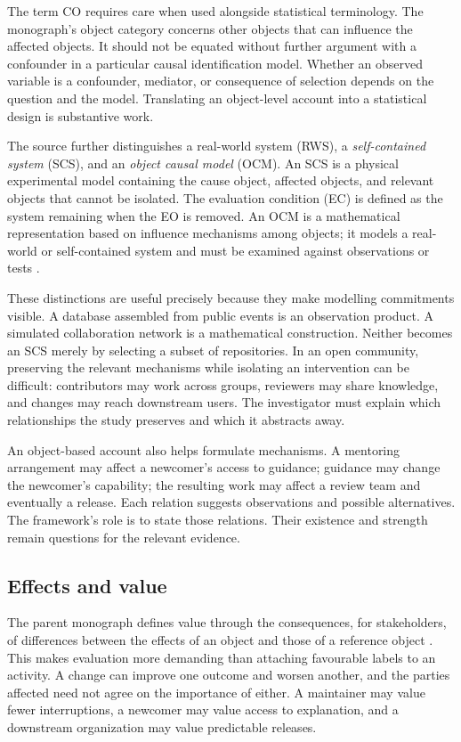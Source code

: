 The term CO requires care when used alongside statistical terminology. The monograph's object category concerns other objects that can influence the affected objects. It should not be equated without further argument with a confounder in a particular causal identification model. Whether an observed variable is a confounder, mediator, or consequence of selection depends on the question and the model. Translating an object-level account into a statistical design is substantive work.

The source further distinguishes a real-world system (RWS), a \emph{self-contained system} (SCS), and an \emph{object causal model} (OCM). An SCS is a physical experimental model containing the cause object, affected objects, and relevant objects that cannot be isolated. The evaluation condition (EC) is defined as the system remaining when the EO is removed. An OCM is a mathematical representation based on influence mechanisms among objects; it models a real-world or self-contained system and must be examined against observations or tests \citep[pp.~117--120]{zhan2026book}.

These distinctions are useful precisely because they make modelling commitments visible. A database assembled from public events is an observation product. A simulated collaboration network is a mathematical construction. Neither becomes an SCS merely by selecting a subset of repositories. In an open community, preserving the relevant mechanisms while isolating an intervention can be difficult: contributors may work across groups, reviewers may share knowledge, and changes may reach downstream users. The investigator must explain which relationships the study preserves and which it abstracts away.

An object-based account also helps formulate mechanisms. A mentoring arrangement may affect a newcomer's access to guidance; guidance may change the newcomer's capability; the resulting work may affect a review team and eventually a release. Each relation suggests observations and possible alternatives. The framework's role is to state those relations. Their existence and strength remain questions for the relevant evidence.

\subsection{Effects and value}
The parent monograph defines value through the consequences, for stakeholders, of differences between the effects of an object and those of a reference object \citep[Chapter~11]{zhan2026book}. This makes evaluation more demanding than attaching favourable labels to an activity. A change can improve one outcome and worsen another, and the parties affected need not agree on the importance of either. A maintainer may value fewer interruptions, a newcomer may value access to explanation, and a downstream organization may value predictable releases.

